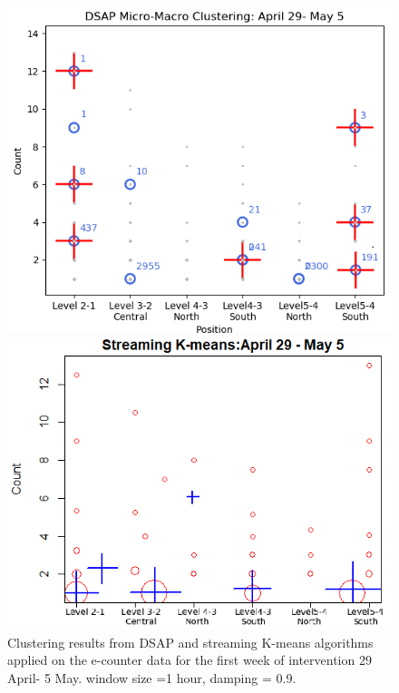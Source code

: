 \begin{figure}[h!]
\medskip
\begin{minipage}{0.45\textwidth}
\includegraphics[width=\linewidth]{image/Chapters/Chapter6/duringInte1week.png}
\end{minipage}
\begin{minipage}{0.45\textwidth}
\includegraphics[width=\linewidth]{image/Chapters/Chapter6/StreamKDuring.png}
\end{minipage}
\caption{Clustering results from DSAP and streaming K-means algorithms applied on the e-counter data for the first week of intervention 29 April- 5 May. window size =1 hour, damping = 0.9.} \label{fig:d}


\end{figure}
